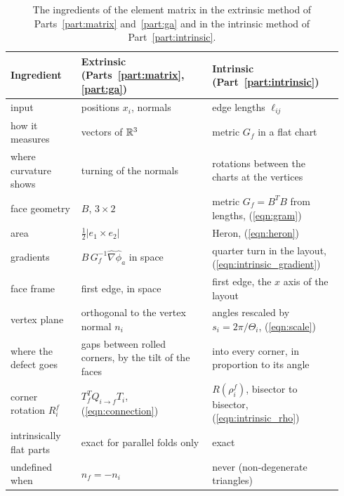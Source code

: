 \begin{table}[t]
\centering
\caption{The ingredients of the element matrix in the extrinsic method of Parts~\ref{part:matrix} and~\ref{part:ga} and in the intrinsic method of Part~\ref{part:intrinsic}.}
\label{tab:intrinsic}
\footnotesize
\setlength{\tabcolsep}{3pt}
\begin{tabular}{p{0.2\linewidth} p{0.37\linewidth} p{0.37\linewidth}}
\toprule
Ingredient & Extrinsic (Parts~\ref{part:matrix}, \ref{part:ga}) & Intrinsic (Part~\ref{part:intrinsic}) \\
\midrule
input & positions $x_i$, normals & edge lengths $\ell_{ij}$ \\
how it measures & vectors of $\mathbb{R}^3$ & metric $G_f$ in a flat chart \\
where curvature shows & turning of the normals & rotations between the charts at the vertices \\
face geometry & $B$, $3 \times 2$ & metric $G_f = B^T B$ from lengths, (\ref{eqn:gram}) \\
area & $\frac12 |e_1 \times e_2|$ & Heron, (\ref{eqn:heron}) \\
gradients & $B\,G_f^{-1}\hat\nabla\hat\phi_a$ in space & quarter turn in the layout, (\ref{eqn:intrinsic_gradient}) \\
face frame & first edge, in space & first edge, the $x$ axis of the layout \\
vertex plane & orthogonal to the vertex normal $n_i$ & angles rescaled by $s_i = 2\pi/\Theta_i$, (\ref{eqn:scale}) \\
where the defect goes & gaps between rolled corners, by the tilt of the faces & into every corner, in proportion to its angle \\
corner rotation $R_i^f$ & $T_f^TQ_{i\to f}T_i$, (\ref{eqn:connection}) & $R(\rho_i^f)$, bisector to bisector, (\ref{eqn:intrinsic_rho}) \\
intrinsically flat parts & exact for parallel folds only & exact \\
undefined when & $n_f = -n_i$ & never (non-degenerate triangles) \\
\bottomrule
\end{tabular}
\end{table}

